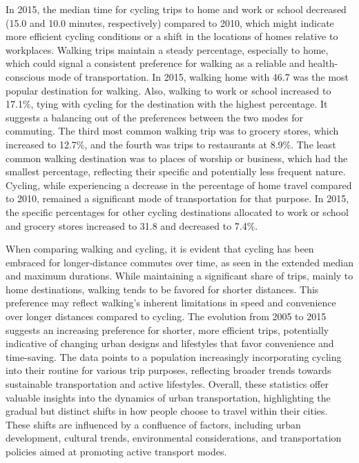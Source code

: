 \documentclass[
11pt, %
oneside, %
english, %
singlespacing, %
]{macthesis} %
\begin{document}
In 2015, the median time for cycling trips to home and work or school decreased (15.0 and 10.0 minutes, respectively) compared to 2010, which might indicate more efficient cycling conditions or a shift in the locations of homes relative to workplaces. Walking trips maintain a steady percentage, especially to home, which could signal a consistent preference for walking as a reliable and health-conscious mode of transportation. In 2015, walking home with 46.7 was the most popular destination for walking. Also, walking to work or school increased to 17.1\%, tying with cycling for the destination with the highest percentage. It suggests a balancing out of the preferences between the two modes for commuting. The third most common walking trip was to grocery stores, which increased to 12.7\%, and the fourth was trips to restaurants at 8.9\%. The least common walking destination was to places of worship or business, which had the smallest percentage, reflecting their specific and potentially less frequent nature.
Cycling, while experiencing a decrease in the percentage of home travel compared to 2010, remained a significant mode of transportation for that purpose. In 2015, the specific percentages for other cycling destinations allocated to work or school and grocery stores increased to 31.8 and decreased to 7.4\%.

When comparing walking and cycling, it is evident that cycling has been embraced for longer-distance commutes over time, as seen in the extended median and maximum durations. While maintaining a significant share of trips, mainly to home destinations, walking tends to be favored for shorter distances. This preference may reflect walking's inherent limitations in speed and convenience over longer distances compared to cycling.
The evolution from 2005 to 2015 suggests an increasing preference for shorter, more efficient trips, potentially indicative of changing urban designs and lifestyles that favor convenience and time-saving. The data points to a population increasingly incorporating cycling into their routine for various trip purposes, reflecting broader trends towards sustainable transportation and active lifestyles. Overall, these statistics offer valuable insights into the dynamics of urban transportation, highlighting the gradual but distinct shifts in how people choose to travel within their cities. These shifts are influenced by a confluence of factors, including urban development, cultural trends, environmental considerations, and transportation policies aimed at promoting active transport modes.
\end{document}
